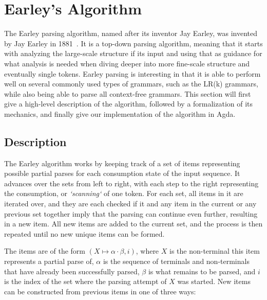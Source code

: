 \chapter{Earley's Algorithm} \label{Earleys}

	The Earley parsing algorithm, named after its inventor Jay Earley, was
	invented by Jay Earley in 1881~\cite{Earley}. It is a top-down parsing
	algorithm, meaning that it starts with analyzing the large-scale structure
	if its input and using that as guidance for what analysis is needed when
	diving deeper into more fine-scale structure and eventually single tokens.
	Earley parsing is interesting in that it is able to perform well on
	several commonly used types of grammars, such as the LR(k) grammars, while
	also being able to parse all context-free grammars. This section will first
	give a high-level description of the algorithm, followed by a formalization
	of its mechanics, and finally give our implementation of the algorithm in
	Agda.

	\section{Description}
		
		The Earley algorithm works by keeping track of a set of items
		representing possible partial parses for each consumption state of the
		input sequence. It advances over the sets from left to right, with each 
		step to the right representing the consumption, or \emph{`scanning`} of 
		one token. For each set, all items in it are iterated over, and they 
		are each checked if it and any item in the current or any previous set 
		together imply that the parsing can continue even further, resulting in 
		a new item. All new items are added to the current set, and the process 
		is then repeated until no new unique items can be formed.

		The items are of the form $(X \mapsto \alpha \cdot \beta, i)$, where
		$X$ is the non-terminal this item represents a partial parse of,
		$\alpha$ is the sequence of terminals and non-terminals that have
		already been successfully parsed, $\beta$ is what remains to be parsed,
		and $i$ is the index of the set where the parsing attempt of $X$ was
		started. New items can be constructed from previous items in one of
		three ways:

